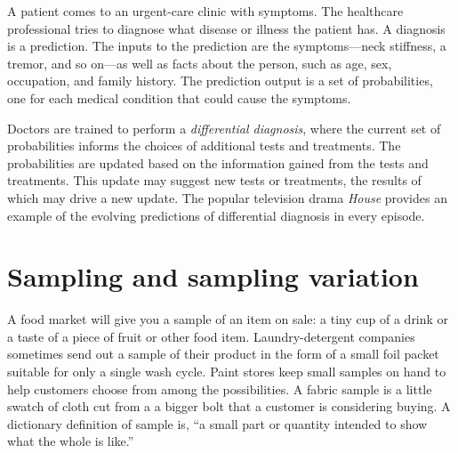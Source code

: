 \documentclass[
  letterpaper,
  DIV=11,
  numbers=noendperiod,
  oneside]{scrartcl}
\begin{document}
\begin{tcolorbox}[enhanced jigsaw, colbacktitle=quarto-callout-note-color!10!white, opacityback=0, breakable, opacitybacktitle=0.6, colback=white, coltitle=black, arc=.35mm, title=\textcolor{quarto-callout-note-color}{\faInfo}\hspace{0.5em}{Example: Differential diagnosis}, left=2mm, colframe=quarto-callout-note-color-frame, rightrule=.15mm, bottomrule=.15mm, leftrule=.75mm, bottomtitle=1mm, toptitle=1mm, titlerule=0mm, toprule=.15mm]

A patient comes to an urgent-care clinic with symptoms. The healthcare
professional tries to diagnose what disease or illness the patient has.
A diagnosis is a prediction. The inputs to the prediction are the
symptoms---neck stiffness, a tremor, and so on---as well as facts about
the person, such as age, sex, occupation, and family history. The
prediction output is a set of probabilities, one for each medical
condition that could cause the symptoms.

Doctors are trained to perform a \emph{differential diagnosis}, where
the current set of probabilities informs the choices of additional tests
and treatments. The probabilities are updated based on the information
gained from the tests and treatments. This update may suggest new tests
or treatments, the results of which may drive a new update. The popular
television drama \emph{House} provides an example of the evolving
predictions of differential diagnosis in every episode.

\end{tcolorbox}

\newpage

\section{Sampling and sampling variation}\label{sec-sampling-variation}

A food market will give you a sample of an item on sale: a tiny cup of a
drink or a taste of a piece of fruit or other food item.
Laundry-detergent companies sometimes send out a sample of their product
in the form of a small foil packet suitable for only a single wash
cycle. Paint stores keep small samples on hand to help customers choose
from among the possibilities. A fabric sample is a little swatch of
cloth cut from a a bigger bolt that a customer is considering buying. A
dictionary definition of sample is,
{} ``a small part or quantity intended to
show what the whole is like.''
\end{document}
